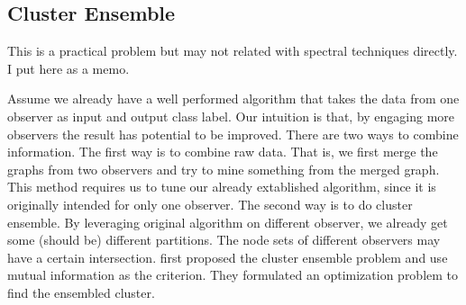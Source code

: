 \documentclass[11pt,a4paper]{article}
\begin{document}
\subsection{Cluster Ensemble}

This is a practical problem but may not related with spectral techniques directly. 
I put here as a memo. 

Assume we already have a well performed algorithm that takes the data from 
one observer as input and output class label. Our intuition is that, 
by engaging more observers the result has potential to be improved. 
There are two ways to combine information. The first way is to combine raw data. 
That is, we first merge the graphs from two observers and try to 
mine something from the merged graph. This method requires us to 
tune our already extablished algorithm, since it is originally intended 
for only one observer. The second way is to do cluster ensemble. 
By leveraging original algorithm on different observer, we already 
get some (should be) different partitions. The node sets of different 
observers may have a certain intersection. \cite{strehl2003cluster} 
first proposed the cluster ensemble problem and use mutual information 
as the criterion. They formulated an optimization problem to find
the ensembled cluster. 


\end{document}
